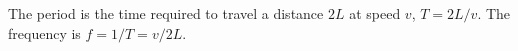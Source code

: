 The period is the time required to travel a distance $2L$ at speed $v$,
$T=2L/v$. The frequency is $f=1/T=v/2L$.



